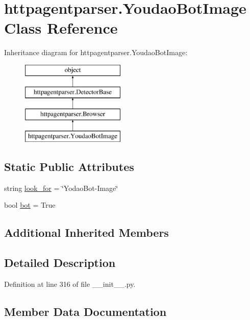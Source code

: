 \hypertarget{classhttpagentparser_1_1_youdao_bot_image}{}\section{httpagentparser.\+Youdao\+Bot\+Image Class Reference}
\label{classhttpagentparser_1_1_youdao_bot_image}
Inheritance diagram for httpagentparser.\+Youdao\+Bot\+Image\+:\begin{figure}[H]
\begin{center}
\leavevmode
\includegraphics[height=4.000000cm]{classhttpagentparser_1_1_youdao_bot_image}
\end{center}
\end{figure}
\subsection*{Static Public Attributes}
\begin{DoxyCompactItemize}
\item 
string \hyperlink{classhttpagentparser_1_1_youdao_bot_image_a172b7acb0758b421c18b728e18f0e242}{look\+\_\+for} = \char`\"{}Yodao\+Bot-\/Image\char`\"{}
\item 
bool \hyperlink{classhttpagentparser_1_1_youdao_bot_image_a231a8a7ddf890116685308498e2281a1}{bot} = True
\end{DoxyCompactItemize}
\subsection*{Additional Inherited Members}


\subsection{Detailed Description}


Definition at line 316 of file \+\_\+\+\_\+init\+\_\+\+\_\+.\+py.



\subsection{Member Data Documentation}
\hypertarget{classhttpagentparser_1_1_youdao_bot_image_a231a8a7ddf890116685308498e2281a1}{}\label{classhttpagentparser_1_1_youdao_bot_image_a231a8a7ddf890116685308498e2281a1} 
